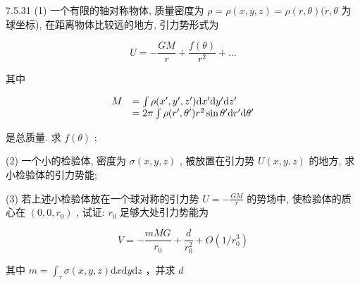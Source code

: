 \begin{problem}{7.5.31}
(1) 一个有限的轴对称物体, 质量密度为 $\rho = \rho(x, y, z) = \rho(r, \theta)(r, \theta$ 为球坐标), 在距离物体比较远的地方, 引力势形式为

\[
U = - \frac {G M}{r} + \frac {f (\theta)}{r ^ {2}} + \dots
\]

其中

\[
\begin{array}{r l} M & = \int \rho (x ^ {\prime}, y ^ {\prime}, z ^ {\prime}) \mathrm{d} x ^ {\prime} \mathrm{d} y ^ {\prime} \mathrm{d} z ^ {\prime} \\ & = 2 \pi \int \rho (r ^ {\prime}, \theta^ {\prime}) r ^ {2} \sin \theta^ {\prime} \mathrm{d} r ^ {\prime} \mathrm{d} \theta^ {\prime} \end{array}
\]

是总质量. 求 $f(\theta)$ ;

(2) 一个小的检验体, 密度为 $\sigma(x, y, z)$ , 被放置在引力势 $U(x, y, z)$ 的地方, 求小检验体的引力势能;

(3) 若上述小检验体放在一个球对称的引力势 $U = -\frac{GM}{r}$ 的势场中, 使检验体的质心在 $(0,0,r_0)$ , 试证: $r_0$ 足够大处引力势能为

\[
V = - \frac {m M G}{r _ {0}} + \frac {d}{r _ {0} ^ {2}} + O (1 / r _ {0} ^ {3})
\]

其中 $m = \int_{\tau}\sigma (x,y,z)\mathrm{d}x\mathrm{d}y\mathrm{d}z$ ，并求 $d$
\end{problem}
\clearpage

